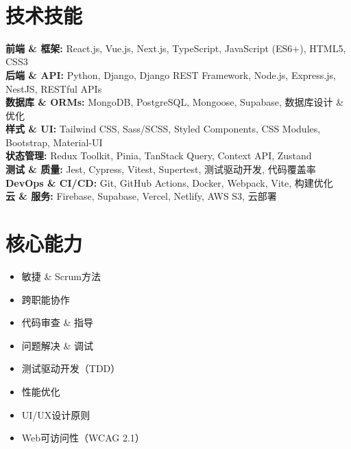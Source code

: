 \documentclass[10pt,a4paper]{article}
\newcommand{\Project}[2]{%
  \vspace{2pt}
  \noindent{\normalsize\textbf{\color{darkgray}#1}} \\
  \textcolor{lightgray}{\small #2}
  \vspace{1pt}
}
\begin{document}
\Project{React电影应用 --- 娱乐发现平台}{%
}

\section*{技术技能}

\noindent
\textbf{\color{darkgray}前端 \& 框架:} React.js, Vue.js, Next.js, TypeScript, JavaScript (ES6+), HTML5, CSS3 \\
\textbf{\color{darkgray}后端 \& API:} Python, Django, Django REST Framework, Node.js, Express.js, NestJS, RESTful APIs \\
\textbf{\color{darkgray}数据库 \& ORMs:} MongoDB, PostgreSQL, Mongoose, Supabase, 数据库设计 \& 优化 \\
\textbf{\color{darkgray}样式 \& UI:} Tailwind CSS, Sass/SCSS, Styled Components, CSS Modules, Bootstrap, Material-UI \\
\textbf{\color{darkgray}状态管理:} Redux Toolkit, Pinia, TanStack Query, Context API, Zustand \\
\textbf{\color{darkgray}测试 \& 质量:} Jest, Cypress, Vitest, Supertest, 测试驱动开发, 代码覆盖率 \\
\textbf{\color{darkgray}DevOps \& CI/CD:} Git, GitHub Actions, Docker, Webpack, Vite, 构建优化 \\
\textbf{\color{darkgray}云 \& 服务:} Firebase, Supabase, Vercel, Netlify, AWS S3, 云部署

\section*{核心能力}

\noindent
\begin{minipage}[t]{0.48\textwidth}
  \begin{itemize}
    \item 敏捷 \& Scrum方法
    \item 跨职能协作
    \item 代码审查 \& 指导
    \item 问题解决 \& 调试
  \end{itemize}
\end{minipage}%
\hfill
\begin{minipage}[t]{0.48\textwidth}
  \begin{itemize}
    \item 测试驱动开发（TDD）
    \item 性能优化
    \item UI/UX设计原则
    \item Web可访问性（WCAG 2.1）
  \end{itemize}
\end{minipage}
\end{document}
